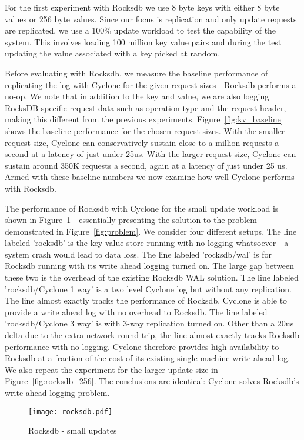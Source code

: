 \documentclass[twocolumn]{article}
\begin{document}
For the first experiment with Rocksdb we use 8 byte keys with either
8 byte values or 256 byte values.  Since our
focus is replication and only update requests are replicated, we use a 100\%
update workload to test the capability of the system. This involves loading 100
million key value pairs and during the test updating the value associated with a
key picked at random.

Before evaluating with Rocksdb, we measure the baseline performance of
replicating the log with Cyclone for the given request sizes - Rocksdb performs
a no-op. We note that in addition to the key and value, we are also logging
RocksDB specific request data such as operation type and the request header,
making this different from the previous experiments.
Figure~\ref{fig:kv_baseline} shows the baseline performance for the chosen
request sizes. With the smaller request size, Cyclone can conservatively sustain
close to a million requests a second at a latency of just under 25us. With the
larger request size, Cyclone can sustain around 350K requests a second, again at
a latency of just under 25 us. Armed with these baseline numbers we now examine
how well Cyclone performs with Rocksdb.

The performance of Rocksdb with Cyclone for the small update workload is shown
in Figure~\ref{fig:rocksdb} - essentially presenting the solution to the problem
demonstrated in Figure~\ref{fig:problem}.  We consider four different
setups. The line labeled 'rocksdb' is the key value store running with no
logging whatsoever - a system crash would lead to data loss. The line labeled
'rocksdb/wal' is for Rocksdb running with its write ahead logging turned on. The
large gap between these two is the overhead of the existing Rocksdb WAL
solution. The line labeled 'rocksdb/Cyclone 1 way' is a two level Cyclone log
but without any replication. The line almost exactly tracks the performance of
Rocksdb. Cyclone is able to provide a write ahead log with no overhead to
Rocksdb. The line labeled 'rocksdb/Cyclone 3 way' is with 3-way replication
turned on. Other than a 20us delta due to the extra network round trip, the line
almost exactly tracks Rocksdb performance with no logging. Cyclone therefore
provides high availability to Rocksdb at a fraction of the cost of its existing
single machine write ahead log. We also repeat the experiment for the larger
update size in Figure~\ref{fig:rocksdb_256}. The conclusions are identical:
Cyclone solves Rocksdb's write ahead logging problem.

\begin{figure}
    \centering
    \texttt{[image: rocksdb.pdf]}
    \caption{Rocksdb - small updates}
    \label{fig:rocksdb}
  \end{figure}
   
\end{document}

